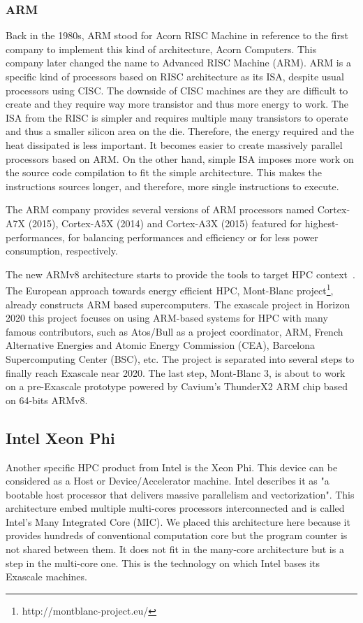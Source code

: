\subsubsection{ARM}
Back in the 1980s, ARM stood for Acorn RISC Machine in reference to the first company to implement this kind of architecture, Acorn Computers. 
This company later changed the name to Advanced RISC Machine (ARM). 
ARM is a specific kind of processors based on RISC architecture as its ISA, despite usual processors using CISC.
The downside of CISC machines are they are difficult to create and they require way more transistor and thus more energy to work. 
The ISA from the RISC is simpler and requires multiple many transistors to operate and thus a smaller silicon area on the die.
Therefore, the energy required and the heat dissipated is less important. 
It becomes easier to create massively parallel processors based on ARM. 
On the other hand, simple ISA imposes more work on the source code compilation to fit the simple architecture. 
This makes the instructions sources longer, and therefore, more single instructions to execute. 

The ARM company provides several versions of ARM processors named Cortex-A7X (2015), Cortex-A5X (2014) and Cortex-A3X (2015) featured for highest-performances, for balancing performances and efficiency or for less power consumption, respectively. 

The new ARMv8 architecture starts to provide the tools to target HPC context~\cite{rico2017arm}.
The European approach towards energy efficient HPC, Mont-Blanc project\footnote{http://montblanc-project.eu/}, already constructs ARM based supercomputers. 
The exascale project in Horizon 2020 this project focuses on using ARM-based systems for HPC with many famous contributors, such as Atos/Bull as a project coordinator, ARM, French Alternative Energies and Atomic Energy Commission (CEA), Barcelona Supercomputing Center (BSC), etc.
The project is separated into several steps to finally reach Exascale near 2020. 
The last step, Mont-Blanc 3, is about to work on a pre-Exascale prototype powered by Cavium’s ThunderX2 ARM chip based on 64-bits ARMv8.

\subsection{Intel Xeon Phi}
Another specific HPC product from Intel is the Xeon Phi. 
This device can be considered as a Host or Device/Accelerator machine. 
Intel describes it as "a bootable host processor that delivers massive parallelism and vectorization".
This architecture embed multiple multi-cores processors interconnected and is called Intel's Many Integrated Core (MIC).
We placed this architecture here because it provides hundreds of conventional computation core but the program counter is not shared between them. 
It does not fit in the many-core architecture but is a step in the multi-core one. 
This is the technology on which Intel bases its Exascale machines. 

